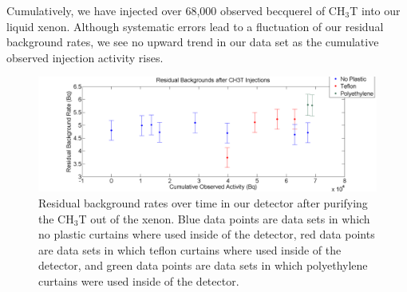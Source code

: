 Cumulatively, we have injected over 68,000 observed becquerel of CH$_3$T into our liquid xenon.  Although systematic errors lead to a fluctuation of our residual background rates, we see no upward trend in our data set as the cumulative observed injection activity rises.


\begin{figure}[h]
\centering
\includegraphics[scale=0.15]{ResidualBackgroundCorrected_SystemErr.png}
\caption{Residual background rates over time in our detector after purifying the CH$_3$T out of the xenon. Blue data points are data sets in which no plastic curtains where used inside of the detector, red data points are data sets in which teflon curtains where used inside of the detector, and green data points are data sets in which polyethylene curtains were used inside of the detector.}
\label{fig:ResBack}
\end{figure}

